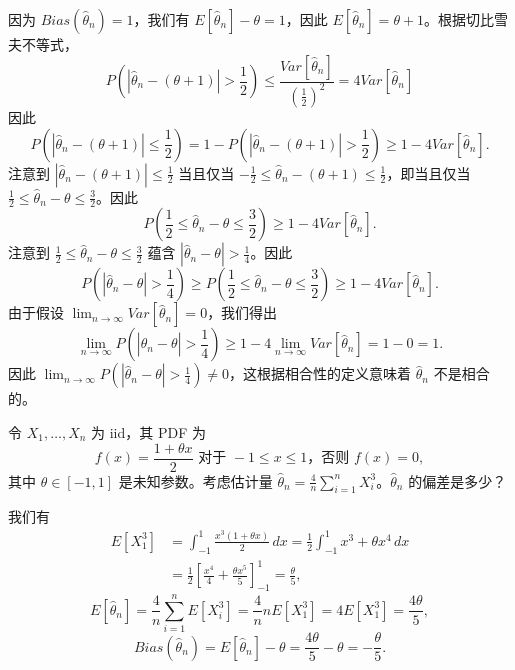 \begin{questions}
\begin{solution}
因为 $Bias(\hat{\theta}_n) = 1$，我们有 $E[\hat{\theta}_n] - \theta = 1$，因此 $E[\hat{\theta}_n] = \theta + 1$。根据切比雪夫不等式，
\[
P\left(|\hat{\theta}_n - (\theta + 1)| > \frac{1}{2}\right) \le \frac{Var[\hat{\theta}_n]}{\left(\frac{1}{2}\right)^2} = 4 Var[\hat{\theta}_n]
\]
因此
\[
P\left(|\hat{\theta}_n - (\theta + 1)| \le \frac{1}{2}\right) = 1 - P\left(|\hat{\theta}_n - (\theta + 1)| > \frac{1}{2}\right) \ge 1 - 4 Var[\hat{\theta}_n].
\]
注意到 $|\hat{\theta}_n - (\theta + 1)| \le \frac{1}{2}$ 当且仅当 $-\frac{1}{2} \le \hat{\theta}_n - (\theta + 1) \le \frac{1}{2}$，即当且仅当 $\frac{1}{2} \le \hat{\theta}_n - \theta \le \frac{3}{2}$。因此
\[
P\left(\frac{1}{2} \le \hat{\theta}_n - \theta \le \frac{3}{2}\right) \ge 1 - 4 Var[\hat{\theta}_n].
\]
注意到 $\frac{1}{2} \le \hat{\theta}_n - \theta \le \frac{3}{2}$ 蕴含 $|\hat{\theta}_n - \theta| > \frac{1}{4}$。因此
\[
P\left(|\hat{\theta}_n - \theta| > \frac{1}{4}\right) \ge P\left(\frac{1}{2} \le \hat{\theta}_n - \theta \le \frac{3}{2}\right) \ge 1 - 4 Var[\hat{\theta}_n].
\]
由于假设 $\lim_{n \to \infty} Var[\hat{\theta}_n] = 0$，我们得出
\[
\lim_{n \to \infty} P\left(|\hat{\theta}_n - \theta| > \frac{1}{4}\right) \ge 1 - 4 \lim_{n \to \infty} Var[\hat{\theta}_n] = 1 - 0 = 1.
\]
因此 $\lim_{n \to \infty} P\left(|\hat{\theta}_n - \theta| > \frac{1}{4}\right) \neq 0$，这根据相合性的定义意味着 $\hat{\theta}_n$ 不是相合的。
\end{solution}

\question 令 $X_1, \dots, X_n$ 为 iid，其 PDF 为
\[
f(x) = \frac{1 + \theta x}{2} \text{ 对于 } -1 \le x \le 1 \text{，否则 } f(x) = 0,
\]
其中 $\theta \in [-1, 1]$ 是未知参数。考虑估计量 $\hat{\theta}_n = \frac{4}{n} \sum_{i=1}^n X_i^3$。$\hat{\theta}_n$ 的偏差是多少？

\begin{solution}
我们有
\begin{align*}
E[X_1^3] &= \int_{-1}^1 \frac{x^3 (1 + \theta x)}{2} \,dx = \frac{1}{2} \int_{-1}^1 x^3 + \theta x^4 \,dx \\
&= \frac{1}{2} \left[\frac{x^4}{4} + \frac{\theta x^5}{5}\right]_{-1}^1 = \frac{\theta}{5},
\end{align*}
\[
E[\hat{\theta}_n] = \frac{4}{n} \sum_{i=1}^n E[X_i^3] = \frac{4}{n} n E[X_1^3] = 4 E[X_1^3] = \frac{4\theta}{5},
\]
\[
Bias(\hat{\theta}_n) = E[\hat{\theta}_n] - \theta = \frac{4\theta}{5} - \theta = -\frac{\theta}{5}.
\]
\end{solution}


\end{questions}
